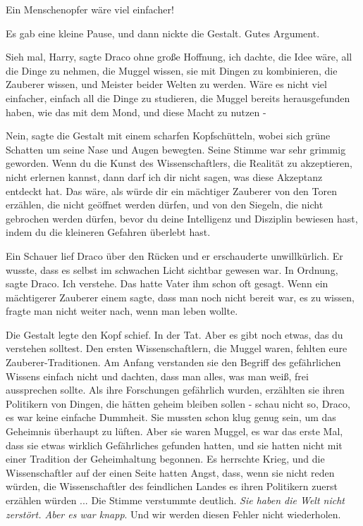 \glqq{}Ein Menschenopfer wäre viel einfacher!\grqq{}

Es gab eine kleine Pause, und dann nickte die Gestalt. \glqq{}Gutes
Argument.\grqq{}

\glqq{}Sieh mal, Harry\grqq{}, sagte Draco ohne große Hoffnung, \glqq{}ich dachte,
die Idee wäre, all die Dinge zu nehmen, die Muggel wissen, sie mit Dingen zu
kombinieren, die Zauberer wissen, und Meister beider Welten zu werden. Wäre es
nicht viel einfacher, einfach all die Dinge zu studieren, die Muggel bereits
herausgefunden haben, wie das mit dem Mond, und diese Macht zu nutzen -\grqq{}

\glqq{}Nein\grqq{}, sagte die Gestalt mit einem scharfen Kopfschütteln, wobei
sich grüne Schatten um seine Nase und Augen bewegten. Seine Stimme war sehr
grimmig geworden. \glqq{}Wenn du die Kunst des Wissenschaftlers, die Realität zu
akzeptieren, nicht erlernen kannst, dann darf ich dir nicht sagen, was diese
Akzeptanz entdeckt hat. Das wäre, als würde dir ein mächtiger Zauberer von den
Toren erzählen, die nicht geöffnet werden dürfen, und von den Siegeln, die nicht
gebrochen werden dürfen, bevor du deine Intelligenz und Disziplin bewiesen hast,
indem du die kleineren Gefahren überlebt hast.\grqq{}

Ein Schauer lief Draco über den Rücken und er erschauderte unwillkürlich. Er
wusste, dass es selbst im schwachen Licht sichtbar gewesen war. \glqq{}In
Ordnung\grqq{}, sagte Draco. \glqq{}Ich verstehe.\grqq{} Das hatte Vater ihm
schon oft gesagt. Wenn ein mächtigerer Zauberer einem sagte, dass man noch nicht
bereit war, es zu wissen, fragte man nicht weiter nach, wenn man leben wollte.

Die Gestalt legte den Kopf schief. \glqq{}In der Tat. Aber es gibt noch etwas,
das du verstehen solltest. Den ersten Wissenschaftlern, die Muggel waren,
fehlten eure Zauberer-Traditionen. Am Anfang verstanden sie den Begriff des
gefährlichen Wissens einfach nicht und dachten, dass man alles, was man weiß,
frei aussprechen sollte. Als ihre Forschungen gefährlich wurden, erzählten sie
ihren Politikern von Dingen, die hätten geheim bleiben sollen - schau nicht so,
Draco, es war keine einfache Dummheit. Sie mussten schon klug genug sein, um das
Geheimnis überhaupt zu lüften. Aber sie waren Muggel, es war das erste Mal, dass
sie etwas wirklich Gefährliches gefunden hatten, und sie hatten nicht mit einer
Tradition der Geheimhaltung begonnen. Es herrschte Krieg, und die
Wissenschaftler auf der einen Seite hatten Angst, dass, wenn sie nicht reden
würden, die Wissenschaftler des feindlichen Landes es ihren Politikern zuerst
erzählen würden ...\grqq{} Die Stimme verstummte deutlich. \glqq{}\emph{Sie haben
die Welt nicht zerstört. Aber es war knapp}. Und wir werden diesen Fehler nicht
wiederholen.\grqq{}

